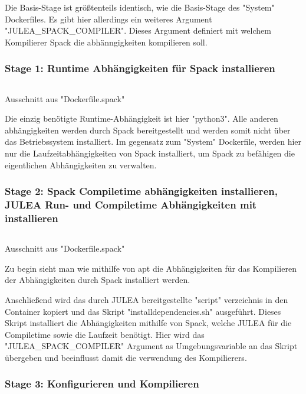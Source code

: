 Die Basis-Stage ist größtenteils identisch, wie die Basis-Stage des "System" Dockerfiles. Es gibt hier allerdings ein weiteres Argument "JULEA\_SPACK\_COMPILER". Dieses Argument definiert mit welchem Kompilierer Spack die abhänngigkeiten kompilieren soll. 

\subsubsection{Stage 1: Runtime Abhängigkeiten für Spack installieren}

\begin{listing}[H]
    \inputminted[firstline=10,lastline=13]{dockerfile}{./code-examples/Dockerfile.spack}
    \caption{Ausschnitt aus "Dockerfile.spack"}
\end{listing}

Die einzig benötigte Runtime-Abhängigkeit ist hier "python3". Alle anderen abhängigkeiten werden durch Spack bereitgestellt und werden somit nicht über das Betriebssystem installiert. Im gegensatz zum "System" Dockerfile, werden hier nur die Laufzeitabhängigkeiten von Spack installiert, um Spack zu befähigen die eigentlichen Abhängigkeiten zu verwalten.


\subsubsection{Stage 2: Spack Compiletime abhängigkeiten installieren, JULEA Run- und Compiletime Abhängigkeiten mit installieren}

\begin{listing}[H]
    \inputminted[firstline=15,lastline=29]{dockerfile}{./code-examples/Dockerfile.spack}
    \caption{Ausschnitt aus "Dockerfile.spack"}
\end{listing}

Zu begin sieht man wie mithilfe von apt die Abhängigkeiten für das Kompilieren der Abhängigkeiten durch Spack installiert werden. 

Anschließend wird das durch JULEA bereitgestellte "script" verzeichnis in den Container kopiert und das Skript "install\-dependencies.sh" ausgeführt. Dieses Skript installiert die Abhängigkeiten mithilfe von Spack, welche JULEA für die Compiletime sowie die Laufzeit benötigt. Hier wird das "JULEA\_SPACK\_COMPILER" Argument as Umgebungsvariable an das Skript übergeben und beeinflusst damit die verwendung des Kompilierers.


\subsubsection{Stage 3: Konfigurieren und Kompilieren}

